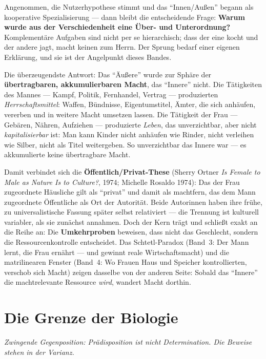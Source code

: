 \documentclass[11pt,a4paper,ngerman]{scrartcl}
\newcommand{\chipbase}[2]{\hspace{0pt}{\footnotesize\textcolor{#1}{[\textsc{#2}]}}}
\newcommand{\chipplausibel}[1]{\chipbase{chipamber}{#1}}
\newcommand{\chipumstritten}[1]{\chipbase{chipred}{#1}}
\begin{document}
Angenommen, die Nutzerhypothese stimmt und das \enquote{Innen/Außen} begann als kooperative Spezialisierung --- dann bleibt die entscheidende Frage: \textbf{Warum wurde aus der Verschiedenheit eine Über- und Unterordnung?} Komplementäre Aufgaben sind nicht per se hierarchisch; dass der eine kocht und der andere jagt, macht keinen zum Herrn. Der Sprung bedarf einer eigenen Erklärung, und sie ist der Angelpunkt dieses Bandes.

Die überzeugendste Antwort: Das \enquote{Äußere} wurde zur Sphäre der \textbf{übertragbaren, akkumulierbaren Macht}, das \enquote{Innere} nicht. Die Tätigkeiten des Mannes --- Kampf, Politik, Fernhandel, Vertrag --- produzierten \emph{Herrschaftsmittel}: Waffen, Bündnisse, Eigentumstitel, Ämter, die sich anhäufen, vererben und in weitere Macht umsetzen lassen. Die Tätigkeit der Frau --- Gebären, Nähren, Aufziehen --- produzierte \emph{Leben}, das unverzichtbar, aber nicht \emph{kapitalisierbar} ist: Man kann Kinder nicht anhäufen wie Rinder, nicht verleihen wie Silber, nicht als Titel weitergeben. So unverzichtbar das Innere war --- es akkumulierte keine übertragbare Macht. \chipplausibel{plausibel}

Damit verbindet sich die \textbf{Öffentlich/Privat-These} (Sherry Ortner \emph{Is Female to Male as Nature Is to Culture?}, 1974; Michelle Rosaldo 1974): Das der Frau zugeordnete Häusliche gilt als \enquote{privat} und damit als machtfern, das dem Mann zugeordnete Öffentliche als Ort der Autorität. Beide Autorinnen haben ihre frühe, zu universalistische Fassung später selbst relativiert --- die Trennung ist kulturell variabler, als sie zunächst annahmen. \chipumstritten{umstritten} Doch der Kern trägt und schließt exakt an die Reihe an: Die \textbf{Umkehrproben} beweisen, dass nicht das Geschlecht, sondern die Ressourcenkontrolle entscheidet. Das Schtetl-Paradox (Band~3: Der Mann lernt, die Frau ernährt --- und gewinnt reale Wirtschaftsmacht) und die matrilinearen Fenster (Band~4: Wo Frauen Haus und Speicher kontrollierten, verschob sich Macht) zeigen dasselbe von der anderen Seite: Sobald das \enquote{Innere} die machtrelevante Ressource \emph{wird}, wandert Macht dorthin. \chipplausibel{plausibel}

\section{Die Grenze der Biologie}
\noindent\textit{Zwingende Gegenposition: Prädisposition ist nicht Determination. Die Beweise stehen in der Varianz.}
\medskip
\end{document}
